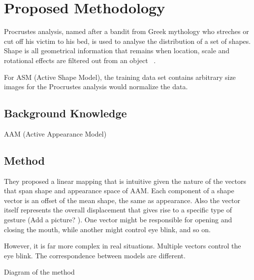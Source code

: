 \chapter{Proposed Methodology}

Procrustes analysis, named after a bandit from Greek mythology who streches or cut off his victim to his bed, is used to analyse the distribution of a set of shapes. Shape is all geometrical information that remains when location, scale and rotational effects are filtered out from an object ~\cite{IMM2002-0403}. 

For ASM (Active Shape Model), the training data set contains arbitrary size images for the Procrustes analysis would normalize the data.

\section{Background Knowledge}
AAM (Active Appearance Model)


\section{Method}

They proposed a linear mapping that is intuitive given the nature of the vectors that span shape and appearance space of AAM. Each component of a shape vector is an offset of the mean shape, the same as appearance. Also the vector itself represents the overall displacement that gives rise to a specific type of gesture (Add a picture? ). One vector might be responsible for opening and closing the mouth, while another might control eye blink, and so on. ~\cite{Theobald07}

However, it is far more complex in real situations. Multiple vectors control the eye blink. The correspondence between models are different. 

Diagram of the method